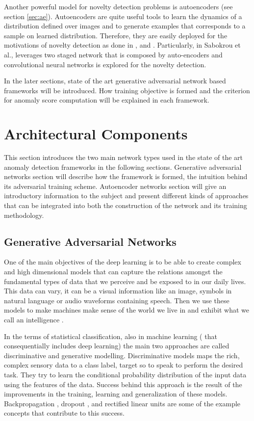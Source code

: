 Another powerful model for novelty detection problems is autoencoders (see section \ref{sec:ae}). Autoencoders are quite useful 
tools to learn the dynamics of a distribution defined over images and to generate examples that corresponds 
to a sample on learned distribution. Therefore, they are easily deployed for the motivations of novelty 
detection as done in \cite{an2015variational}, \cite{leveau2017adversarial} and
\cite{Pidhorskyi:2018:GPN:3327757.3327787}. Particularly, in Sabokrou et al.\cite{sabokrou2018adversarially},
leverages two staged network that is composed by auto-encoders and convolutional neural networks is explored for
the novelty detection. 

In the later sections, state of the art generative adversarial network based frameworks  will be 
introduced. How training objective is formed and the criterion for anomaly score computation will 
be explained in each framework.

\section{Architectural Components}
\label{sec:arch_comp}
This section introduces the two main network types used in the state of the art anomaly detection
frameworks in the following sections. Generative adversarial networks section will describe how the
framework is formed, the intuition behind its adversarial training scheme. Autoencoder networks
section will give an introductory information to the subject and present different kinds of
approaches that can be integrated into both the construction of the network and its training
methodology. 

\subsection{Generative Adversarial Networks}
\label{sec:gan}

One of the main objectives of the deep learning is to be able to create complex and high dimensional
models that can capture the relations amongst the fundamental types of data that we perceive and be
exposed to in our daily lives. This data can vary, it can be a visual information like an image,
symbols in natural language or audio waveforms containing speech. Then we use these models to make
machines make sense of the world we live in and exhibit what we call an intelligence
\cite{Bengio:2009:LDA:1658423.1658424}.


In the terms of statistical classification, also in machine learning ( that consequentially includes
deep learning) the main two approaches are called discriminative and generative modelling.
Discriminative models maps the rich, complex sensory data to a class label, target so to speak to
perform the desired task. They try to learn the conditional probability distribution of the input
data using the features of the data. Success behind this approach is the result of the
improvements in the training, learning and generalization of these models. Backpropagation
\cite{Widrow2008AppendixGT}, dropout \cite{Srivastava2014DropoutAS}, and rectified linear
units\cite{Glorot2011DeepSR} are some of the example concepts that contribute to this success.

